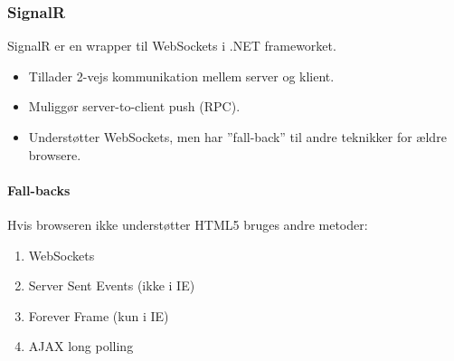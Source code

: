 \subsubsection{SignalR}
SignalR er en wrapper til WebSockets i .NET frameworket.

\begin{itemize}
	\item Tillader 2-vejs kommunikation mellem server og klient.
	\item Muliggør server-to-client push (RPC).
	\item Understøtter WebSockets, men har ''fall-back'' til andre teknikker for ældre browsere.
\end{itemize}

\paragraph{Fall-backs} Hvis browseren ikke understøtter HTML5 bruges andre metoder: 

\begin{enumerate}
	\item WebSockets
	\item Server Sent Events (ikke i IE)
	\item Forever Frame (kun i IE)
	\item AJAX long polling
\end{enumerate}
